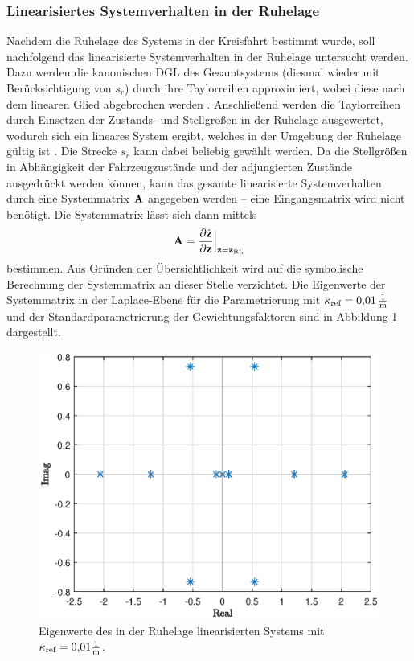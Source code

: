 \subsubsection{Linearisiertes Systemverhalten in der Ruhelage}\label{subsubsec:Linearisierung}
Nachdem die Ruhelage des Systems in der Kreisfahrt bestimmt wurde, soll nachfolgend das linearisierte Systemverhalten in der Ruhelage untersucht werden. Dazu werden die kanonischen \gls{DGL} des Gesamtsystems (diesmal wieder mit Berücksichtigung von $s_r$) durch ihre Taylorreihen approximiert, wobei diese nach dem linearen Glied abgebrochen werden \cite{ModSim}. Anschließend werden die Taylorreihen durch Einsetzen der Zustands- und Stellgrößen in der Ruhelage ausgewertet, wodurch sich ein lineares System ergibt, welches in der Umgebung der Ruhelage gültig ist \cite{ModSim}. Die Strecke $s_r$ kann dabei beliebig gewählt werden. Da die Stellgrößen in Abhängigkeit der Fahrzeugzustände und der adjungierten Zustände ausgedrückt werden können, kann das gesamte linearisierte Systemverhalten durch eine Systemmatrix ${\boldsymbol{\mathrm{A}}}$ angegeben werden -- eine Eingangsmatrix wird nicht benötigt. Die Systemmatrix lässt sich dann mittels
\begin{equation}
{\ensuremath{\boldsymbol{\mathrm{A}}}} = \frac{\partial \dot{\boldsymbol{\mathrm{z}}}}{\partial \boldsymbol{\mathrm{z}}}\Big|_{\boldsymbol{\mathrm{z}}=\boldsymbol{\mathrm{z}}_{\textrm{RL}}}
\end{equation}
bestimmen. Aus Gründen der Übersichtlichkeit wird auf die symbolische Berechnung der Systemmatrix an dieser Stelle verzichtet. Die Eigenwerte der Systemmatrix in der Laplace-Ebene für die Parametrierung mit $\kappa_{\textrm{ref}}= 0{,}01\,\mathrm{\frac{1}{\mathrm{m}}}$ und der Standardparametrierung der Gewichtungsfaktoren sind in Abbildung \ref{fig:EW_linear_Kreisfahrt} dargestellt.
\begin{figure}[h] 
	\centering
	\includegraphics[width=0.7\linewidth]{./Bilder/Ergebnisse/Kreisfahrt/Mit_Querdynamik/EW_linear_Kreisfahrt.eps}
	\caption{Eigenwerte des in der Ruhelage linearisierten Systems mit $\kappa_{\textrm{ref}} = 0{,}01\frac{1}{\mathrm{m}}$.}
	\label{fig:EW_linear_Kreisfahrt}
\end{figure} 
